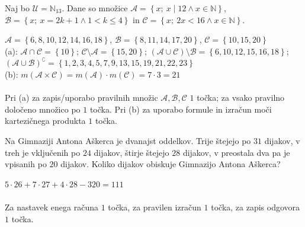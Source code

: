 \documentclass[addpoints,12pt]{exam}
\begin{document}
\begin{questions}
    \newpage

    \question
    Naj bo $\mathcal{U}=\mathbb{N}_{13}$. Dane so množice $\mathcal{A}=\left\{x;\ x\mid 12 \land x\in\mathbb{N}\right\}$, \\ $\mathcal{B}=\left\{x;\ x=2k+1 \land 1< k\leq 4\right\}$ in $\mathcal{C}=\left\{x;\ 2x<16 \land x\in\mathbb{N}\right\}$. 

    \begin{solution}[14cm]
        $\mathcal{A}=\left\{6,8,10,12,14,16,18\right\}$, $\mathcal{B}=\left\{8,11,14,17,20\right\}$, $\mathcal{C}=\left\{10,15,20\right\}$ \\
        (a): $\mathcal{A}\cap\mathcal{C}=\left\{10\right\}$; $\mathcal{C}\setminus\mathcal{A}=\left\{15,20\right\}$; $(\mathcal{A}\cup\mathcal{C})\setminus\mathcal{B}=\left\{6,10,12,15,16,18\right\}$; $(\mathcal{A}\cup\mathcal{B})^\complement=\left\{1,2,3,4,5,7,9,13,15,19,21,22,23\right\}$ \\
        (b): $m(\mathcal{A}\times\mathcal{C})=m(\mathcal{A})\cdot m(\mathcal{C})=7\cdot 3 = 21$ \\ \\
        Pri (a) za zapis/uporabo pravilnih množic $\mathcal{A}, \mathcal{B}, \mathcal{C}$ $1$ točka; za vsako pravilno določeno množico po $1$ točka. Pri (b) za uporabo formule in izračun moči kartezičnega produkta $1$ točka.
    \end{solution}


 \newpage
        

    \question[3]
    Na Gimnaziji Antona Aškerca je dvanajst oddelkov. Trije štejejo po $31$ dijakov, v treh je vključenih po $24$ dijakov, štirje štejejo $28$ dijakov,
    v preostala dva pa je vpisanih po $20$ dijakov.
    Koliko dijakov obiskuje Gimnazijo Antona Aškerca?

    \begin{solution}[4cm]
        $5\cdot 26+7\cdot 27+4\cdot 28-320=111$ \\ \\
        Za nastavek enega računa $1$ točka, za pravilen izračun $1$ točka, za zapis odgovora $1$ točka.
    \end{solution}



    
\end{questions}
\end{document}
